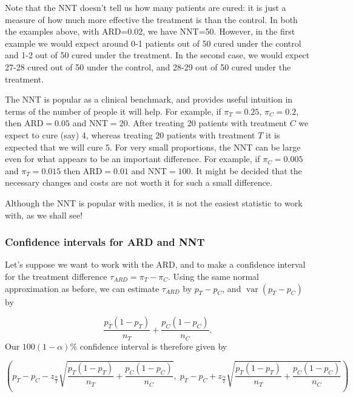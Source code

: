 \documentclass[
  openany]{book}
\theoremstyle{definition}
\theoremstyle{definition}
\theoremstyle{definition}
\theoremstyle{definition}
\theoremstyle{remark}
\begin{document}
Note that the NNT doesn't tell us how many patients are cured: it is just a measure of how much more effective the treatment is than the control. In both the examples above, with ARD=0.02, we have NNT=50. However, in the first example we would expect around 0-1 patients out of 50 cured under the control and 1-2 out of 50 cured under the treatment. In the second case, we would expect 27-28 cured out of 50 under the control, and 28-29 out of 50 cured under the treatment.

The NNT is popular as a clinical benchmark, and provides useful intuition in terms of the number of people it will help. For example, if \(\pi_T = 0.25,\,\pi_C=0.2\), then \(\text{ARD} = 0.05\) and \(\text{NNT} = 20.\) After treating 20 patients with treatment \(C\) we expect to cure (say) 4, whereas treating 20 patients with treatment \(T\) it is expected that we will cure 5. For very small proportions, the NNT can be large even for what appears to be an important difference. For example, if \(\pi_C=0.005\) and \(\pi_T = 0.015\) then \(\text{ARD}=0.01\) and \(\text{NNT}=100\). It might be decided that the necessary changes and costs are not worth it for such a small difference.

Although the NNT is popular with medics, it is not the easiest statistic to work with, as we shall see!

\subsubsection{Confidence intervals for ARD and NNT}\label{confint-ardnnt}

Let's suppose we want to work with the ARD, and to make a confidence interval for the treatment difference \(\tau_{ARD} = \pi_T - \pi_C\). Using the same normal approximation as before, we can estimate \(\tau_{ARD}\) by \(p_T - p_C\), and \(\operatorname{var}\left(p_T - p_C\right)\) by

\[ \frac{p_T\left(1-p_T\right)}{n_T} + \frac{p_C\left(1-p_C\right)}{n_C}.\]
Our \(100\left(1-\alpha\right)\)\% confidence interval is therefore given by

\[\left(p_T - p_C - z_{\frac{\alpha}{2}}\sqrt{\frac{p_T\left(1-p_T\right)}{n_T} + \frac{p_C\left(1-p_C\right)}{n_C}},\; p_T - p_C + z_{\frac{\alpha}{2}}\sqrt{\frac{p_T\left(1-p_T\right)}{n_T} + \frac{p_C\left(1-p_C\right)}{n_C}}\right) \]
\end{document}
